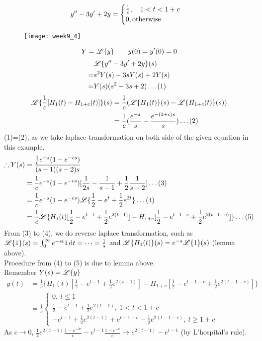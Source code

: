 \begin{example}
\[y^{\prime\prime}-3y^{\prime}+2y=\begin{cases}\frac{1}{c},\quad 1<t<1+c\\0, \text{otherwise}\end{cases}
\]
\begin{figure}[H]
\centering
\texttt{[image: week9\_4]}
\end{figure}
\[Y=\mathscr{L}\{y\}\qquad y(0)=y^{\prime}(0)=0
\]
\[\begin{aligned}
&\mathscr{L}\{y^{\prime\prime}-3y^{\prime}+2y\}(s)\\
=&s^2Y(s)-3sY(s)+2Y(s)\\
=&Y(s)(s^2-3s+2)\dots(1)
\end{aligned}
\]
\[\begin{aligned}\mathscr{L}\{\frac{1}{c}[H_1(t)-H_{1+c}(t)]\}(s)&=\frac{1}{c}(\mathscr{L}\{H_1(t)\}(s)-\mathscr{L}\{H_{1+c}(t)\}(s))\\&=\frac{1}{c}(\frac{e^{-s}}{s}-\frac{e^{-(1+c)s}}{s})\dots(2)\end{aligned}
\]
(1)=(2), as we take laplace transformation on both side of the given equation in this example.
\[\begin{aligned}\therefore Y(s)&=\frac{\frac{1}{c}e^{-s}(1-e^{-cs})}{(s-1)(s-2)s}\\
&=\frac{1}{c}e^{-s}(1-e^{-cs})[\frac{1}{2s}-\frac{1}{s-1}+\frac{1}{2}\frac{1}{s-2}]\dots(3)\\
&=\frac{1}{c}e^{-s}(1-e^{-cs})\mathscr{L}\{\frac{1}{2}-e^t+\frac{1}{2}e^{2t}\}\dots(4)\\
&=\frac{1}{c}\mathscr{L}\{H_1(t)[\frac{1}{2}-e^{t-1}+\frac{1}{2}e^{2(t-1)}]-H_{1+c}[\frac{1}{2}-e^{t-1-c}+\frac{1}{2}e^{2(t-1-c)}]\}\dots(5)
\end{aligned}
\]
From (3) to (4), we do reverse laplace transformation, such as $\mathscr{L}\{1\}(s)=\int_0^\infty e^{-st}1\,\mathrm{d} t=\dots=\frac{1}{s}$ and $\mathscr{L}\{H_1(t)\}(s)=e^{-s}\mathscr{L}\{1\}(s)$ (lemma above).\\
Procedure from (4) to (5) is due to lemma above.\\
Remember $Y(s)=\mathscr{L}\{y\}$
\[\begin{aligned}y(t)&=\frac{1}{c}\{H_1(t)[\frac{1}{2}-e^{t-1}+\frac{1}{2}e^{2(t-1)}]-H_{1+c}[\frac{1}{2}-e^{t-1-c}+\frac{1}{2}e^{2(t-1-c)}]\}\\
&=\frac{1}{c}\begin{cases}0,~t\leq1\\\frac{1}{2}-e^{t-1}+\frac{1}{2}e^{2(t-1)},~1<t<1+c\\-e^{t-1}+\frac{1}{2}e^{2(t-1)}+e^{t-1-c}-\frac{1}{2}e^{2(t-1-c)},~t\geq1+c\end{cases}
\end{aligned}
\]
As $c\rightarrow0$, $\frac{1}{2}e^{2(t-1)}\frac{1-e^{-2c}}{c}-e^{t-1}\frac{1-e^{-c}}{c}\rightarrow e^{2(t-1)}-e^{t-1}$ (by L'hospital's rule).

\end{example}

